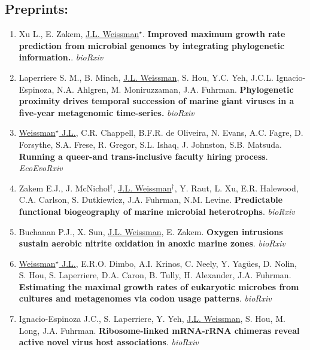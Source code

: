 \documentclass[]{res}
\begin{document}
\begin{resume}
 
 \section{Preprints:} \vspace{0mm}
  
 \begin{enumerate}[leftmargin=*]
 \setlength\itemsep{0.25em}
 
\item Xu L., E. Zakem, \underline{J.L. Weissman$^\star$}. {\bf Improved maximum growth rate prediction from microbial genomes by integrating phylogenetic information.}. \emph{bioRxiv}
 
\item Laperriere S. M., B. Minch, \underline{J.L. Weissman}, S. Hou, Y.C. Yeh, J.C.L. Ignacio-Espinoza, N.A. Ahlgren, M. Moniruzzaman, J.A. Fuhrman. {\bf Phylogenetic proximity drives temporal succession of marine giant viruses in a five-year metagenomic time-series.} \emph{bioRxiv}

\item \underline{Weissman$^\star$ J.L.}, C.R. Chappell, B.F.R. de Oliveira, N. Evans, A.C. Fagre, D. Forsythe, S.A. Frese, R. Gregor, S.L. Ishaq, J. Johnston, S.B. Matsuda. {\bf Running a queer-and trans-inclusive faculty hiring process}. \emph{EcoEvoRxiv}

\item Zakem E.J., J. McNichol$^\dagger$, \underline{J.L. Weissman}$^\dagger$, Y. Raut, L. Xu, E.R. Halewood, C.A. Carlson, S. Dutkiewicz, J.A. Fuhrman, N.M. Levine. {\bf Predictable functional biogeography of marine microbial heterotrophs}. \emph{bioRxiv}

\item Buchanan P.J., X. Sun, \underline{J.L. Weissman}, E. Zakem. {\bf Oxygen intrusions sustain aerobic nitrite 
oxidation in anoxic marine zones}. \emph{bioRxiv}

\item \underline{Weissman$^\star$ J.L.}, E.R.O. Dimbo, A.I. Krinos, C. Neely, Y. Yag\"{ues}, D. Nolin, S. Hou, S. Laperriere, D.A. Caron, B. Tully, H. Alexander, J.A. Fuhrman. {\bf Estimating the maximal growth rates of eukaryotic microbes from cultures and metagenomes via codon usage patterns}. \emph{bioRxiv}

\item Ignacio-Espinoza J.C., S. Laperriere, Y. Yeh, \underline{J.L. Weissman}, S. Hou, M. Long, J.A. Fuhrman. {\bf Ribosome-linked mRNA-rRNA chimeras reveal active novel virus host associations}. \emph{bioRxiv}
 


\end{enumerate}
\end{resume}
\end{document}
